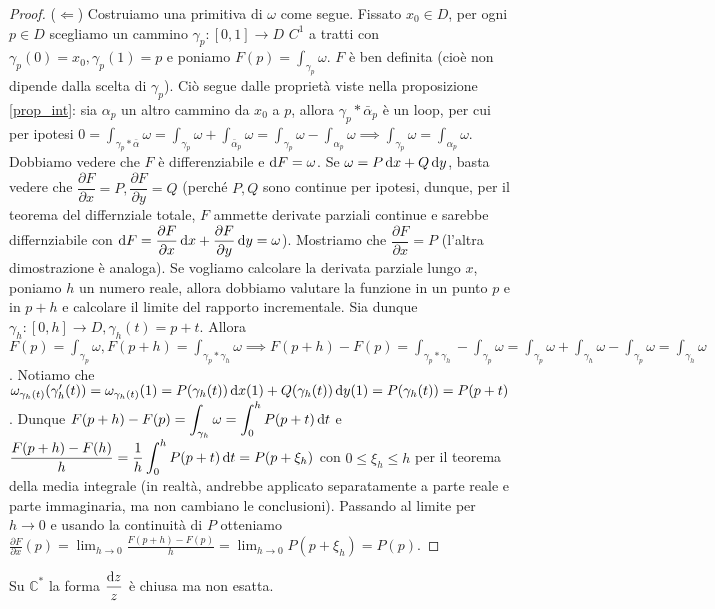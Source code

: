 \begin{proof}
  ($\Leftarrow$) Costruiamo una primitiva di $\omega$ come segue. Fissato $x_0 \in D$, per ogni $p \in D$ scegliamo un cammino $\gamma_p:[0, 1] \longrightarrow D$ $C^1$ a tratti con $\gamma_p(0)=x_0, \gamma_p(1)=p$ e poniamo $\displaystyle F(p)=\int_{\gamma_p} \omega$. $F$ è ben definita (cioè non dipende dalla scelta di $\gamma_p$).
  Ciò segue dalle proprietà viste nella proposizione \ref{prop_int}: sia $\alpha_p$ un altro cammino da $x_0$ a $p$, allora $\gamma_p*\bar{\alpha}_p$ è un loop, per cui per ipotesi $\displaystyle 0=\int_{\gamma_p*\bar{\alpha}} \omega=\int_{\gamma_p} \omega+\int_{\bar{\alpha}_p} \omega=\int_{\gamma_p} \omega-\int_{\alpha_p} \omega \implies \int_{\gamma_p} \omega=\int_{\alpha_p} \omega$.
  Dobbiamo vedere che $F$ è differenziabile e $\mathop{}\!\mathrm{d} F=\omega$. Se $\omega=P\mathop{}\!\mathrm{d} x+Q\mathop{}\!\mathrm{d} y$, basta vedere che $\dfrac{\partial F}{\partial x}=P, \dfrac{\partial F}{\partial y}=Q$ (perché $P, Q$ sono continue per ipotesi, dunque, per il teorema del differnziale totale, $F$ ammette derivate parziali continue e sarebbe differnziabile con $\mathop{}\!\mathrm{d} F=\dfrac{\partial F}{\partial x}\mathop{}\!\mathrm{d} x+\dfrac{\partial F}{\partial y}\mathop{}\!\mathrm{d} y=\omega$).
  Mostriamo che $\dfrac{\partial F}{\partial x}=P$ (l'altra dimostrazione è analoga). Se vogliamo calcolare la derivata parziale lungo $x$, poniamo $h$ un numero reale, allora dobbiamo valutare la funzione in un punto $p$ e in $p+h$ e calcolare il limite del rapporto incrementale. Sia dunque $\gamma_h:[0, h] \longrightarrow D, \gamma_h(t)=p+t$.
  Allora $\displaystyle F(p)=\int_{\gamma_p} \omega, F(p+h)=\int_{\gamma_p*\gamma_h} \omega \implies F(p+h)-F(p)=\int_{\gamma_p*\gamma_h}-\int_{\gamma_p} \omega=\int_{\gamma_p} \omega+\int_{\gamma_h} \omega-\int_{\gamma_p} \omega=\int_{\gamma_h} \omega$.
  Notiamo che $\omega_{\gamma_h(t)}(\gamma_h'(t))=\omega_{\gamma_h(t)}(1)=P(\gamma_h(t))\mathop{}\!\mathrm{d} x(1)+Q(\gamma_h(t)) \mathop{}\!\mathrm{d} y(1)=P(\gamma_h(t))=P(p+t)$.
  Dunque $\displaystyle F(p+h)-F(p)=\int_{\gamma_h} \omega=\int_0^h P(p+t)\mathop{}\!\mathrm{d} t$ e $\displaystyle \frac{F(p+h)-F(h)}{h}=\frac{1}{h}\int_0^h P(p+t)\mathop{}\!\mathrm{d} t=P(p+\xi_h)$ con $0 \le \xi_h \le h$ per il teorema della media integrale (in realtà, andrebbe applicato separatamente a parte reale e parte immaginaria, ma non cambiano le conclusioni).
  Passando al limite per $h \longrightarrow 0$ e usando la continuità di $P$ otteniamo $\displaystyle \frac{\partial F}{\partial x}(p)=\lim_{h \longrightarrow 0} \frac{F(p+h)-F(p)}{h}=\lim_{h \longrightarrow 0} P(p+\xi_h)=P(p)$.
\end{proof}

\begin{cor}
  Su $\mathbb{C}^*$ la forma $\dfrac{\mathop{}\!\mathrm{d} z}{z}$ è chiusa ma non esatta.
\end{cor}


